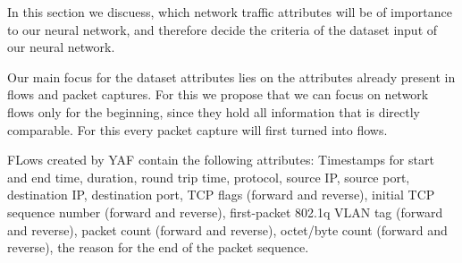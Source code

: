\documentclass[
	ngerman,
	ruledheaders=section,%
	class=report,%
	thesis={type=bachelor},%
	accentcolor=9c,%
	custommargins=true,%
	marginpar=false,%
	parskip=half-,%
	fontsize=11pt,%
]{tudapub}
\begin{document}
In this section we discuess, which network traffic attributes will be of importance to our neural network,
and therefore decide the criteria of the dataset input of our neural network.

Our main focus for the dataset attributes lies on the attributes already present in flows and packet captures.
For this we propose that we can focus on network flows only for the beginning, since they hold all information that is directly comparable.
For this every packet capture will first turned into flows.

FLows created by YAF contain the following attributes:
Timestamps for start and end time, duration, round trip time, protocol, source IP, source port, destination IP, destination port, TCP flags (forward and reverse), initial TCP sequence number (forward and reverse), first-packet 802.1q VLAN tag (forward and reverse), packet count (forward and reverse), octet/byte count (forward and reverse), the reason for the end of the packet sequence.





\end{document}
